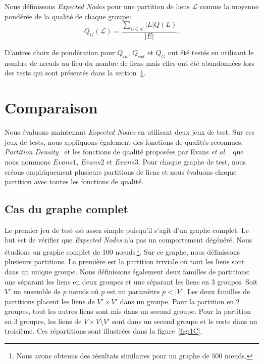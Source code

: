 Nous définissons \emph{Expected Nodes} pour une partition de liens $\mathcal{L}$ comme la moyenne pondérée de la qualité de chaque groupe:
\begin{equation}
\label{eq:qualite_globale} Q_G(\mathcal{L}) = \dfrac{\sum_{L\in \mathcal{L}} |L|Q(L)}{|E|}.
\end{equation}

D'autres choix de pondération pour $Q_{in}$, $Q_{ext}$ et $Q_G$ ont été testés en utilisant le nombre de n\oe uds au lieu du nombre de liens mais elles ont été abandonnées lors des tests qui sont présentés dans la section~\ref{sec:expected_comp}.

\section{Comparaison}
\label{sec:expected_comp}
Nous évaluons maintenant \emph{Expected Nodes} en utilisant deux jeux de test.
Sur ces jeux de tests, nous appliquons également des fonctions de qualités reconnues:
\emph{Partition Density}~\cite{Ahn2010a} et les fonctions de qualité proposées par Evans \emph{et al.}~\cite{Evans2009} que nous nommons $Evans1$, $Evans2$ et $Evans3$.
Pour chaque graphe de test, nous créons empiriquement plusieurs partitions de liens et nous évaluons chaque partition avec toutes les fonctions de qualité.

\subsection{Cas du graphe complet}
\label{Completegraph}
Le premier jeu de test est assez simple puisqu'il s'agit d'un graphe complet.
Le but est de vérifier que \emph{Expected Nodes} n'a pas un comportement dégénéré.
Nous étudions un graphe complet de $100$ n\oe uds\,\footnote{Nous avons obtenus des résultats similaires pour un graphe de $500$ n\oe uds.}.
Sur ce graphe, nous définissons plusieurs partitions.
La première est la partition triviale où tout les liens sont dans un unique groupe.
Nous définissons également deux familles de partitions: une séparant les liens en deux groupes et une séparant les liens en 3 groupes.
Soit $V'$ un ensemble de $p$ n\oe uds où $p$ est un paramètre $p<|V|$.
Les deux familles de partitions placent les liens de $V' \times V'$ dans un groupe.
Pour la partition en 2 groupes, tout les autres liens sont mis dans un second groupe.
Pour la partition en 3 groupes, les liens de $V \times V\setminus V'$ sont dans un second groupe et le reste dans un troisième.
Ces répartitions sont illustrées dans la figure~\ref{fig:1C}.

